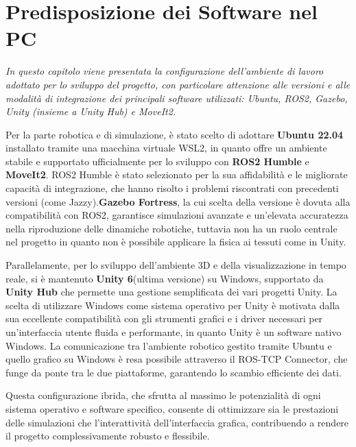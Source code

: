 \documentclass[11pt]{report}
\begin{document}

\section{Predisposizione dei Software nel PC}
\textit{In questo capitolo viene presentata la configurazione dell'ambiente di lavoro adottato per lo sviluppo del progetto, con particolare attenzione alle versioni e alle modalità di integrazione dei principali software utilizzati: Ubuntu, ROS2, Gazebo, Unity (insieme a Unity Hub) e MoveIt2.}

Per la parte robotica e di simulazione, è stato scelto di adottare \textbf{Ubuntu 22.04} installato tramite una macchina virtuale WSL2, in quanto offre un ambiente stabile e supportato ufficialmente per lo sviluppo con \textbf{ROS2 Humble} e \textbf{MoveIt2}. ROS2 Humble è stato selezionato per la sua affidabilità e le migliorate capacità di integrazione, che hanno risolto i problemi riscontrati con precedenti versioni (come Jazzy).\textbf{Gazebo Fortress}, la cui scelta della versione è dovuta alla compatibilità con ROS2\cite{Gazebo-ROS2}, garantisce simulazioni avanzate e un'elevata accuratezza nella riproduzione delle dinamiche robotiche, tuttavia non ha un ruolo centrale nel progetto in quanto non è possibile applicare la fisica ai tessuti come in Unity.

Parallelamente, per lo sviluppo dell'ambiente 3D e della visualizzazione in tempo reale, si è mantenuto \textbf{Unity 6}(ultima versione) su Windows, supportato da \textbf{Unity Hub} che permette una gestione semplificata dei vari progetti Unity. La scelta di utilizzare Windows come sistema operativo per Unity è motivata dalla sua eccellente compatibilità con gli strumenti grafici e i driver necessari per un'interfaccia utente fluida e performante, in quanto Unity è un software nativo Windows. La comunicazione tra l'ambiente robotico gestito tramite Ubuntu e quello grafico su Windows è resa possibile attraverso il ROS-TCP Connector, che funge da ponte tra le due piattaforme, garantendo lo scambio efficiente dei dati.

Questa configurazione ibrida, che sfrutta al massimo le potenzialità di ogni sistema operativo e software specifico, consente di ottimizzare sia le prestazioni delle simulazioni che l'interattività dell'interfaccia grafica, contribuendo a rendere il progetto complessivamente robusto e flessibile.
\end{document}

